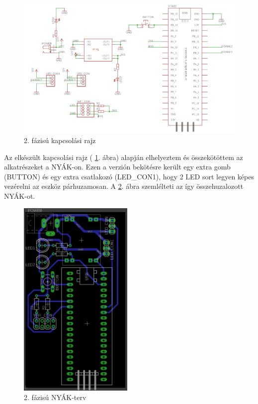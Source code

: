 \documentclass[../main.tex]{subfiles}
\begin{document}
        \begin{figure}[h!]
            \centering
                \includegraphics[width=15cm]{resources/pcb_res/schematic_v01.png}
            \caption{2. fázisú kapcsolási rajz}
            \label{fig:schematic_v01}
        \end{figure}
        
        Az elkészült kapcsolási rajz ( \ref{fig:schematic_v01}. ábra) alapján elhelyeztem és összekötöttem az alkatrészeket a NYÁK-on. Ezen a verzión bekötésre került egy extra gomb (BUTTON) és egy extra csatlakozó (LED\_CON1), hogy 2 LED sort legyen képes vezérelni az eszköz párhuzamosan. A \ref{fig:board_v01}. ábra szemlélteti az így összehuzalozott NYÁK-ot.
        
        \begin{figure}[h!]
            \centering
                \includegraphics[width=5.5cm, angle =-90]{resources/pcb_res/board_v01.png}
            \caption{2. fázisú NYÁK-terv}
            \label{fig:board_v01}
        \end{figure}
        
\end{document}

